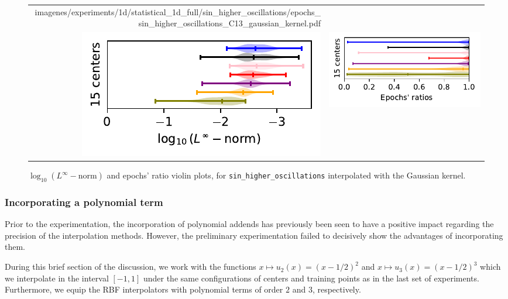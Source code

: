 \documentclass[12pt]{report} %
\begin{document}
\begin{figure}[H]
\begin{tabular}{rl}
{        {imagenes/experiments/1d/statistical_1d_full/sin_higher_oscillations/epochs_sin_higher_oscillations_C13_gaussian_kernel.pdf}}
    \\
    {\includegraphics[width=.5\textwidth, trim={0 0.2cm 0 0},clip=true]
    {imagenes/experiments/1d/statistical_1d_full/sin_higher_oscillations/linf_sin_higher_oscillations_C15_gaussian_kernel.pdf}}
                                                                                                              & 
  {\includegraphics[width=.44\textwidth, trim={.7cm 0.2cm 0 0},clip=true]
        {imagenes/experiments/1d/statistical_1d_full/sin_higher_oscillations/epochs_sin_higher_oscillations_C15_gaussian_kernel.pdf}}
  \end{tabular}
  \caption{$\log_{10}(L^\infty-\text{norm})$ and epochs' ratio violin plots, for \texttt{sin\_higher\_oscillations} interpolated with the Gaussian kernel.}
  \label{fig:statistic-result-sin-higher-oscillations-gaussian-kernel}
\end{figure}

\subsubsection*{Incorporating a polynomial term}

Prior to the experimentation, the incorporation of polynomial addends has previously been seen to have a positive impact regarding the precision of the interpolation methods. However, the preliminary experimentation failed to decisively show the advantages of incorporating them. 

During this brief section of the discussion, we work with the functions $x \mapsto u_2(x)=(x-1/2)^2$ and $x \mapsto u_3(x)=(x-1/2)^3$ which we interpolate in the interval $[-1,1]$ under the same configurations of centers and training points as in the last set of experiments. Furthermore, we equip the RBF interpolators with polynomial terms of order $2$ and $3$, respectively. 
\end{document}
